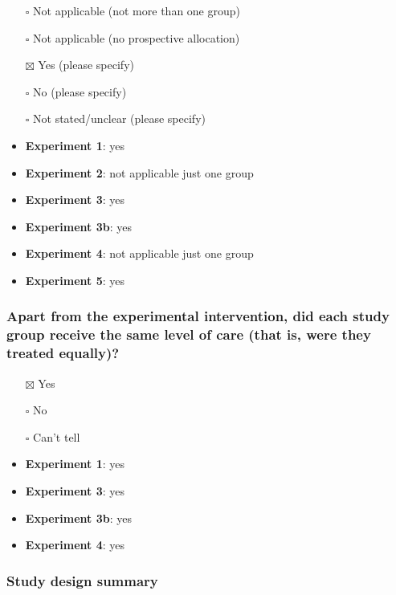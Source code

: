 \documentclass[
  doc, a4paper]{apa7}
\begin{document}
\begin{itemize}
\item[$\square$]
  Not applicable (not more than one group)\\
\item[$\square$]
  Not applicable (no prospective allocation)\\
\item[$\boxtimes$]
  Yes (please specify)\\
\item[$\square$]
  No (please specify)\\
\item[$\square$]
  Not stated/unclear (please specify)
\item
  \textbf{Experiment 1}: yes\\
\item
  \textbf{Experiment 2}: not applicable just one group
\item
  \textbf{Experiment 3}: yes
\item
  \textbf{Experiment 3b}: yes
\item
  \textbf{Experiment 4}: not applicable just one group
\item
  \textbf{Experiment 5}: yes
\end{itemize}

\subsubsection{Apart from the experimental intervention, did each study group receive the same level of care (that is, were they treated equally)?}\label{apart-from-the-experimental-intervention-did-each-study-group-receive-the-same-level-of-care-that-is-were-they-treated-equally}

\begin{itemize}
\item[$\boxtimes$]
  Yes
\item[$\square$]
  No
\item[$\square$]
  Can't tell
\item
  \textbf{Experiment 1}: yes\\
\item
  \textbf{Experiment 3}: yes
\item
  \textbf{Experiment 3b}: yes
\item
  \textbf{Experiment 4}: yes
\end{itemize}

\subsubsection{Study design summary}\label{study-design-summary}
\end{document}
